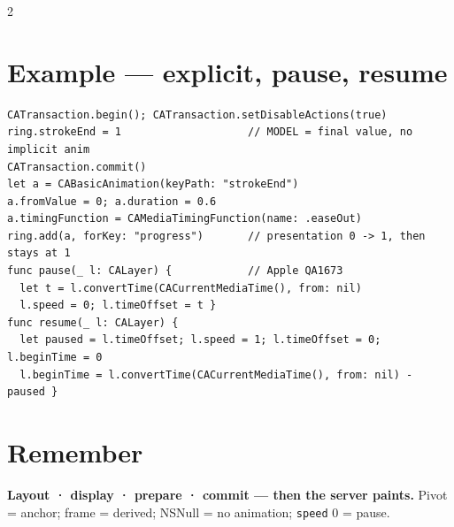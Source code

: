 \documentclass[8pt]{extarticle}
\newcommand\ct[1]{\texttt{#1}}
\begin{document}
\begin{multicols}{2}
\section{Example — explicit, pause, resume}
\begin{lstlisting}[language=SwiftSheet]
CATransaction.begin(); CATransaction.setDisableActions(true)
ring.strokeEnd = 1                    // MODEL = final value, no implicit anim
CATransaction.commit()
let a = CABasicAnimation(keyPath: "strokeEnd")
a.fromValue = 0; a.duration = 0.6
a.timingFunction = CAMediaTimingFunction(name: .easeOut)
ring.add(a, forKey: "progress")       // presentation 0 -> 1, then stays at 1
func pause(_ l: CALayer) {            // Apple QA1673
  let t = l.convertTime(CACurrentMediaTime(), from: nil)
  l.speed = 0; l.timeOffset = t }
func resume(_ l: CALayer) {
  let paused = l.timeOffset; l.speed = 1; l.timeOffset = 0; l.beginTime = 0
  l.beginTime = l.convertTime(CACurrentMediaTime(), from: nil) - paused }
\end{lstlisting}

\section{Remember}
\textbf{Layout · display · prepare · commit — then the server paints.} Pivot = anchor;
frame = derived; NSNull = no animation; \ct{speed} 0 = pause.


\end{multicols}

\end{document}
